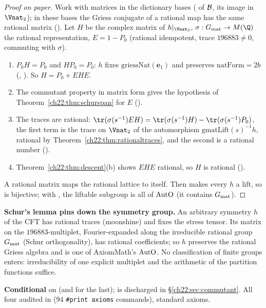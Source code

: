 \begin{proof}[Proof on paper]
Work with matrices in the dictionary bases ( of $\mathcal{B}$,  its image in $\Vnat_2$);
in these bases the Griess conjugate of a rational map has the same rational matrix ().  Let $H$
be the complex matrix of $h|_{\Vnat_2}$, $\sigma:\chtwentytwoGmat\to M(\Q)$ the rational representation, $E=1-P_0$ (rational
idempotent, trace $196883\ne0$, commuting with $\sigma$).
\begin{enumerate}[label=(\arabic*)]
\item $P_0H=P_0$ and $HP_0=P_0$: $h$ fixes $\mathrm{griessNat}(\mathbf{e}_1)$ and preserves $\mathrm{natForm}=2b$
  (, ).  So $H=P_0+EHE$.
\item The commutant property in matrix form gives the hypothesis of Theorem~\ref{ch22:thm:schurspan} for $E$
  ().
\item The traces are rational: $\tr(\sigma(s^{-1})EH)=\tr(\sigma(s^{-1})H)-\tr(\sigma(s^{-1})P_0)$, the first term is the trace
  on $\Vnat_2$ of the automorphism $\mathrm{gmatLift}(s)^{-1}h$, rational by Theorem~\ref{ch22:thm:rationaltraces}, and the
  second is a rational number ().
\item Theorem~\ref{ch22:thm:descent}(b) shows $EHE$ rational, so $H$ is rational ().
\end{enumerate}
A rational matrix maps the rational lattice to itself.  Then  makes every $h$ a lift, so
 is bijective; with , the liftable subgroup is all of $\mathrm{AutO}$ (it contains
$G_{\mathrm{mat}}$).
\end{proof}
\begin{physics}
\textbf{Schur's lemma pins down the symmetry group.}  An arbitrary symmetry $h$ of the CFT has rational traces (moonshine)
and fixes the stress tensor.  Its matrix on the $196883$-multiplet, Fourier-expanded along the irreducible rational group
$G_{\mathrm{mat}}$ (Schur orthogonality), has rational coefficients; so $h$ preserves the rational Griess algebra and is
one of AxiomMath's $\mathrm{AutO}$.  No classification of finite groups enters: irreducibility of one explicit multiplet and
the arithmetic of the partition functions suffice.
\end{physics}
\begin{status}\textbf{Conditional} on  (and  for the last);  is discharged in
\S\ref{ch22:sec:commutant}.  All four audited in  ($94$
\texttt{\#print axioms} commands), standard axioms.\end{status}

